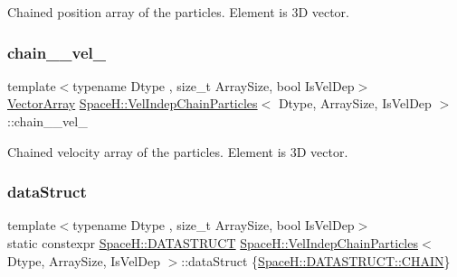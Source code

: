 Chained position array of the particles. Element is 3D vector. 

\mbox{\label{class_space_h_1_1_vel_indep_chain_particles_a79106719ec89861a02086b0a52eced21}} 
\subsubsection{\texorpdfstring{chain_\+\_\+vel\+\_\+}{chain_\_vel\_}}
{\footnotesize\ttfamily template$<$typename Dtype , size\+\_\+t Array\+Size, bool Is\+Vel\+Dep$>$ \\
\mbox{\hyperlink{class_space_h_1_1_vel_indep_particles_aa9983058940249df8b00fa800e8cbad2}{Vector\+Array}} \mbox{\hyperlink{class_space_h_1_1_vel_indep_chain_particles}{Space\+H\+::\+Vel\+Indep\+Chain\+Particles}}$<$ Dtype, Array\+Size, Is\+Vel\+Dep $>$\+::chain_\+\_\+vel\+\_\+\hspace{0.3cm}{\ttfamily [protected]}}



Chained velocity array of the particles. Element is 3D vector. 

\mbox{\label{class_space_h_1_1_vel_indep_chain_particles_acf17d83713bb3f519dc1323418343375}} 
\subsubsection{\texorpdfstring{data\+Struct}{dataStruct}}
{\footnotesize\ttfamily template$<$typename Dtype , size\+\_\+t Array\+Size, bool Is\+Vel\+Dep$>$ \\
static constexpr \mbox{\hyperlink{namespace_space_h_a4782f089179a3c269891f02482b072df}{Space\+H\+::\+D\+A\+T\+A\+S\+T\+R\+U\+CT}} \mbox{\hyperlink{class_space_h_1_1_vel_indep_chain_particles}{Space\+H\+::\+Vel\+Indep\+Chain\+Particles}}$<$ Dtype, Array\+Size, Is\+Vel\+Dep $>$\+::data\+Struct \{\mbox{\hyperlink{namespace_space_h_a4782f089179a3c269891f02482b072dfa014d2cf3cdc3af6f4f92c09190860e33}{Space\+H\+::\+D\+A\+T\+A\+S\+T\+R\+U\+C\+T\+::\+C\+H\+A\+IN}}\}\hspace{0.3cm}{\ttfamily [static]}}



